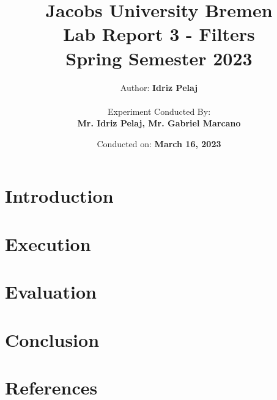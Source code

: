 \documentclass[12pt]{report}
\title{
    \textbf{Jacobs University Bremen} \\
    \vspace{1cm}
    \textbf{Lab Report 3 - Filters} \\ 
    Spring Semester 2023 \\
}
\author{
    Author: \textbf{Idriz Pelaj} \\
    \vspace{1cm} \\
    Experiment Conducted By: \\ \textbf{Mr. Idriz Pelaj, Mr. Gabriel Marcano}
}
\date{Conducted on: \textbf{March 16, 2023}}
\begin{document}
\maketitle

\chapter{Introduction}


\chapter{Execution}


\chapter{Evaluation}


\chapter{Conclusion}


\chapter{References}

\end{document}
